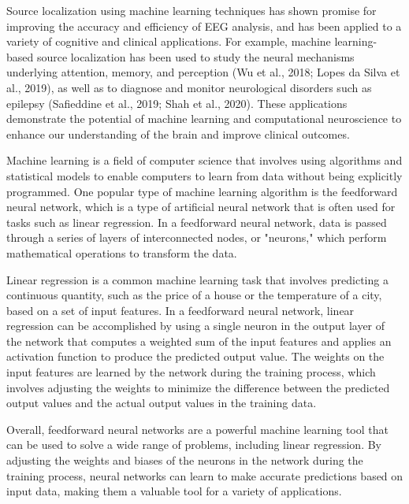 \documentclass[a4paper, UKenglish, 11pt]{uiomaster}
\begin{document}
Source localization using machine learning techniques has shown promise for improving the accuracy and efficiency of EEG analysis, and has been applied to a variety of cognitive and clinical applications. For example, machine learning-based source localization has been used to study the neural mechanisms underlying attention, memory, and perception (Wu et al., 2018; Lopes da Silva et al., 2019), as well as to diagnose and monitor neurological disorders such as epilepsy (Safieddine et al., 2019; Shah et al., 2020). These applications demonstrate the potential of machine learning and computational neuroscience to enhance our understanding of the brain and improve clinical outcomes.

Machine learning is a field of computer science that involves using algorithms and statistical models to enable computers to learn from data without being explicitly programmed. One popular type of machine learning algorithm is the feedforward neural network, which is a type of artificial neural network that is often used for tasks such as linear regression. In a feedforward neural network, data is passed through a series of layers of interconnected nodes, or "neurons," which perform mathematical operations to transform the data.

Linear regression is a common machine learning task that involves predicting a continuous quantity, such as the price of a house or the temperature of a city, based on a set of input features. In a feedforward neural network, linear regression can be accomplished by using a single neuron in the output layer of the network that computes a weighted sum of the input features and applies an activation function to produce the predicted output value. The weights on the input features are learned by the network during the training process, which involves adjusting the weights to minimize the difference between the predicted output values and the actual output values in the training data.

Overall, feedforward neural networks are a powerful machine learning tool that can be used to solve a wide range of problems, including linear regression. By adjusting the weights and biases of the neurons in the network during the training process, neural networks can learn to make accurate predictions based on input data, making them a valuable tool for a variety of applications.

%
%
%
%
\end{document}

